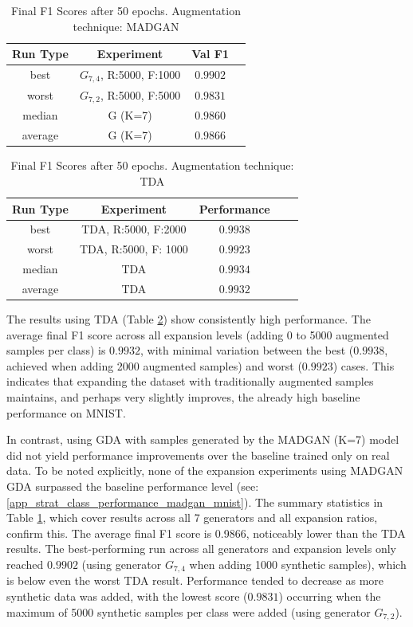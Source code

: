 \begin{table}[H]
	\vspace{-1.5em}
	\centering
	\begin{tabular}{|c|c|c|c|}
		\hline
		Run Type & Experiment & Val F1 \\ \hline
		best & \(G_{7, 4}\), R:5000, F:1000 & $0.9902$\\ \hline
		worst & \(G_{7, 2}\), R:5000, F:5000 & $0.9831$\\ \hline
		median & G (K=7) & $0.9860$\\ \hline
		average & G (K=7) & $0.9866$
		\\ \hline
	\end{tabular}
    \caption{Final F1 Scores after 50 epochs. Augmentation technique: MADGAN}
        \label{tab:res_expansion_mnist_tda_vs_madgan__madgan}
\end{table}
\begin{table}[H]
	\centering
	\vspace{-1.5em}
	\begin{tabular}{|c|c|c|c|c|}
		\hline
		Run Type & Experiment & Performance \\ \hline
		best & TDA, R:5000, F:2000 & $0.9938$\\ \hline
		worst & TDA, R:5000, F: 1000 & $0.9923$\\ \hline
		median & TDA & $0.9934$\\ \hline
		average & TDA & $0.9932$
		\\ \hline
	\end{tabular}
    \caption{Final F1 Scores after 50 epochs. Augmentation technique: TDA}
        \label{tab:res_expansion_mnist_tda_vs_madgan__tda}
\end{table}

The results using TDA (Table \ref{tab:res_expansion_mnist_tda_vs_madgan__tda}) show consistently high performance. The average final F1 score across all expansion levels (adding 0 to 5000 augmented samples per class) is $0.9932$, with minimal variation between the best ($0.9938$, achieved when adding 2000 augmented samples) and worst ($0.9923$) cases. This indicates that expanding the dataset with traditionally augmented samples maintains, and perhaps very slightly improves, the already high baseline performance on MNIST.

In contrast, using GDA with samples generated by the MADGAN (K=7) model did not yield performance improvements over the baseline trained only on real data. To be noted explicitly, none of the expansion experiments using MADGAN GDA surpassed the baseline performance level (see: \ref{app_strat_class_performance_madgan_mnist}). The summary statistics in Table \ref{tab:res_expansion_mnist_tda_vs_madgan__madgan}, which cover results across all 7 generators and all expansion ratios, confirm this. The average final F1 score is 0.9866, noticeably lower than the TDA results. The best-performing run across all generators and expansion levels only reached $0.9902$ (using generator \(G_{7,4}\) when adding 1000 synthetic samples), which is below even the worst TDA result. Performance tended to decrease as more synthetic data was added, with the lowest score ($0.9831$) occurring when the maximum of 5000 synthetic samples per class were added (using generator \(G_{7,2}\)).

